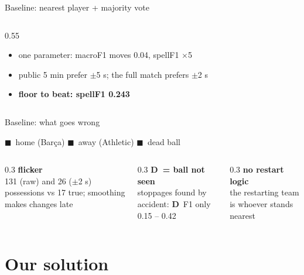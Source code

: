 \documentclass[aspectratio=169,10pt]{beamer}
\newcommand{\Dl}{\textcolor{cD!80!black}{\textbf{D}}}
\newcommand{\sx}{0.041}   %
\newcommand{\hh}{0.42}    %
\def\yy{0}
\newcommand{\strip}[3]{%
  \def\yy{#1}
  \node[anchor=east,font=\scriptsize] at (-0.1,{#1+\hh/2}) {#2};
  
  \draw[black!40,line width=0.2pt] (0,#1) rectangle ({300*\sx},{#1+\hh});}
\newcommand{\timeaxis}[1]{%
  \draw[black!50] (0,#1) -- ({300*\sx},#1);
  \foreach \m in {0,1,...,5} {
    \draw[black!50] ({60*\m*\sx},#1) -- ({60*\m*\sx},{#1-0.08});
    \node[font=\tiny,below] at ({60*\m*\sx},{#1-0.05}) {\m:00};}}
\newcommand{\stripkey}{%
  {\scriptsize\textcolor{cH}{$\blacksquare$}~home (Barça) \quad
   \textcolor{cA}{$\blacksquare$}~away (Athletic) \quad
   \textcolor{cD}{$\blacksquare$}~dead ball}}
\begin{document}
\begin{frame}{Baseline: nearest player + majority vote}
\begin{columns}[T]
\begin{column}{0.55\textwidth}
      \raggedright
      \begin{itemize}\small
        \item one parameter: macroF1 moves 0.04, spellF1 $\times$5
        \item public 5 min prefer $\pm$5 s; the full match prefers $\pm$2 s
        \item \textbf{floor to beat: spellF1 0.243}
      \end{itemize}
    \end{column}
  \end{columns}
\end{frame}

\begin{frame}{Baseline: what goes wrong}
  \centering

  \stripkey

  \vspace{0.4cm}
  \begin{columns}[T]
    \begin{column}{0.3\textwidth}
      \centering
      \textbf{flicker}\\ \small 131 (raw) and 26 ($\pm$2 s) possessions vs 17 true;
      smoothing makes changes late
    \end{column}
    \begin{column}{0.3\textwidth}
      \centering
      \textbf{\Dl\ = ball not seen}\\ \small stoppages found by accident: \Dl\ F1 only 0.15 -- 0.42
    \end{column}
    \begin{column}{0.3\textwidth}
      \centering
      \textbf{no restart logic}\\ \small the restarting team is whoever stands nearest
    \end{column}
  \end{columns}
\end{frame}

\section{Our solution}
\end{document}
